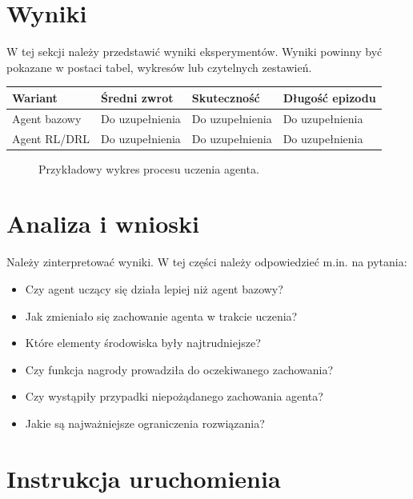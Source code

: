 \documentclass[12pt]{article}
\begin{document}
\section{Wyniki}

W tej sekcji należy przedstawić wyniki eksperymentów. Wyniki powinny być pokazane w postaci tabel, wykresów lub czytelnych zestawień.

\begin{center}
\begin{tabular}{p{}p{}p{}p{}}
\toprule
Wariant & Średni zwrot & Skuteczność & Długość epizodu \\
\midrule
Agent bazowy & Do uzupełnienia & Do uzupełnienia & Do uzupełnienia \\
Agent RL/DRL & Do uzupełnienia & Do uzupełnienia & Do uzupełnienia \\
\bottomrule
\end{tabular}
\end{center}

\begin{figure}[h]
    \centering
    \caption{Przykładowy wykres procesu uczenia agenta.}
\end{figure}

\section{Analiza i wnioski}

Należy zinterpretować wyniki. W tej części należy odpowiedzieć m.in. na pytania:
\begin{itemize}
    \item Czy agent uczący się działa lepiej niż agent bazowy?
    \item Jak zmieniało się zachowanie agenta w trakcie uczenia?
    \item Które elementy środowiska były najtrudniejsze?
    \item Czy funkcja nagrody prowadziła do oczekiwanego zachowania?
    \item Czy wystąpiły przypadki niepożądanego zachowania agenta?
    \item Jakie są najważniejsze ograniczenia rozwiązania?
\end{itemize}

\section{Instrukcja uruchomienia}
\end{document}
